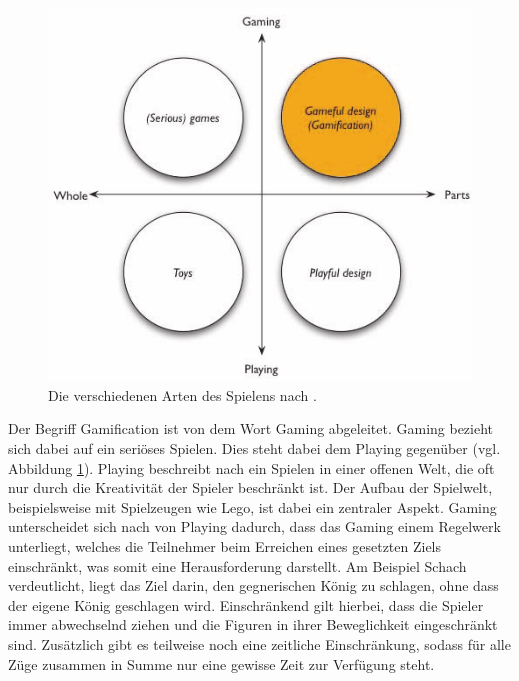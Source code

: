 \documentclass[
	oneside,  %
	ngerman, 
	final, 
	11pt, 
	a4paper, 
	1.1headlines, 
	headinclude=false, 
	footinclude=false, 
	mpinclude=false, 
	pagesize, 
	onecolumn, 
	titlepage, 
	parskip=half, 
	headsepline, 
	chapterprefix=false, 
	version=first, 
	listof=totoc, 
	bibliography=totoc, 
	toc=graduated, 
	fleqn
]{scrbook}
\begin{document}
\begin{figure}[htb]
	\begin{center}
		\includegraphics[scale=0.6]{images/gamification_einordnung}
		\caption{Die verschiedenen Arten des Spielens nach \cite{DD2011}.}
		\label{gamification_einordnung}
	\end{center}
\end{figure}

Der Begriff Gamification ist von dem Wort \glqq Gaming\grqq{} abgeleitet.
Gaming bezieht sich dabei auf ein seriöses Spielen.
Dies steht dabei dem \glqq Playing\grqq{} gegenüber (vgl. Abbildung \ref{gamification_einordnung}).
Playing beschreibt nach \cite{Wa2003} ein Spielen in einer offenen Welt, die oft nur durch die Kreativität der Spieler beschränkt ist.
Der Aufbau der Spielwelt, beispielsweise mit Spielzeugen wie Lego, ist dabei ein zentraler Aspekt.
Gaming unterscheidet sich nach \cite{DD2011} von Playing dadurch, dass das Gaming einem Regelwerk unterliegt, welches die Teilnehmer beim Erreichen eines gesetzten Ziels einschränkt, was somit eine Herausforderung darstellt.
Am Beispiel Schach verdeutlicht, liegt das Ziel darin, den gegnerischen König zu schlagen, ohne dass der eigene König geschlagen wird.
Einschränkend gilt hierbei, dass die Spieler immer abwechselnd ziehen und die Figuren in ihrer Beweglichkeit eingeschränkt sind.
Zusätzlich gibt es teilweise noch eine zeitliche Einschränkung, sodass für alle Züge zusammen in Summe nur eine gewisse Zeit zur Verfügung steht.
\end{document}
